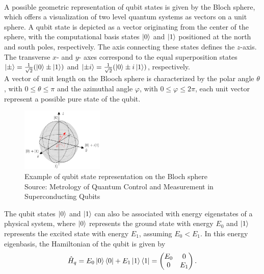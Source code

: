 \paragraph{}
A possible geometric representation of qubit states is given by the Bloch sphere, which offers a visualization of two level quantum systems as vectors on a unit sphere.  
A qubit state is depicted as a vector originating from the center of the sphere, with the computational basis states $\ket{0}$ and $\ket{1}$ positioned at the north and south poles, respectively.
The axis connecting these states defines the $z$-axis. The transverse $x$- and $y$- axes correspond to the equal superposition states $\ket{\pm} = \frac{1}{\sqrt{2}}(\ket{0}\pm\ket{1})$ and $\ket{\pm i} = \frac{1}{\sqrt{2}}(\ket{0}\pm i\ket{1})$, respectively.\\
A vector of unit length on the Blooch sphere is characterized by the polar angle $\theta$, with $0\leq\theta\leq\pi$ and the azimuthal angle $\varphi$, with $0\leq\varphi\leq 2\pi$, each unit vector represent a possible pure state of the qubit.\\

\begin{figure}[h!]
\centering
\includegraphics[width=0.35\textwidth]{figures/png/BlochSphere.png}
\caption{Example of qubit state representation on the Bloch sphere\\
Source: Metrology of Quantum Control and Measurement in Superconducting Qubits \cite{Chen2018}}
\label{fig:BlochSphere}
\end{figure}

The qubit states $\ket{0}$ and $\ket{1}$ can also be associated with energy eigenstates of a physical system, where $\ket{0}$ represents the ground state with energy $E_0$ and $\ket{1}$ represents the excited state with energy $E_1$, assuming $E_0 < E_1$. 
In this energy eigenbasis, the Hamiltonian of the qubit is given by
\begin{equation}\label{eq:qubithamiltonian}
    \hat{H}_q = E_0 \ket{0} \bra{0} + E_1 \ket{1} \bra{1} = 
    \begin{pmatrix}
        E_0 & 0 \\
        0 & E_1
    \end{pmatrix}.
\end{equation}

